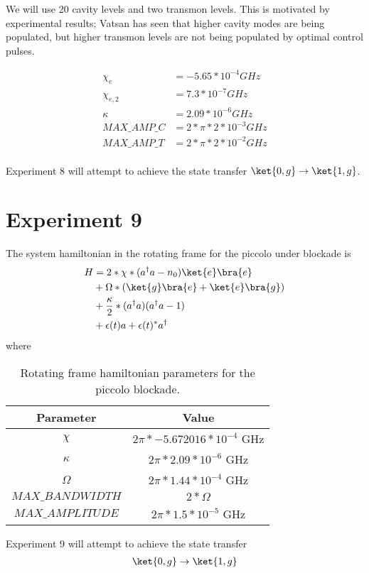 \documentclass[letterpaper, 12pt]{article}
\begin{document}
We will use 20 cavity levels and two transmon levels. This is motivated by experimental results; Vatsan has seen that higher cavity modes are being populated, but higher transmon levels are not being populated by optimal control pulses.

\begin{align*}
  \chi_{e} &= -5.65 * 10^{-4} GHz\\
  \chi_{e, 2} &= 7.3 * 10^{-7} GHz\\
  \kappa &= 2.09 * 10^{-6} GHz\\
  MAX\_AMP\_C &= 2 * \pi * 2 * 10^{-3} GHz\\
  MAX\_AMP\_T &= 2 * \pi * 2 * 10^{-2} GHz\\
\end{align*}

Experiment 8 will attempt to achieve the state transfer $\ket{0, g} \rightarrow \ket{1, g}$.

\section{Experiment 9}
The system hamiltonian in the rotating frame for the piccolo under blockade is
\begin{align*}
  H &= 2 * \chi * (a^{\dagger}a - n_{0}) \ket{e} \bra{e}\\
  &+ \Omega * (\ket{g} \bra{e} + \ket{e} \bra{g})\\
  &+ \frac{\kappa}{2} * (a^{\dagger}a)(a^{\dagger}a - 1)\\
  &+ \epsilon(t)a + \epsilon(t)^{*}a^{\dagger}
\end{align*}
where
\begin{table}[H]
  \begin{center}
    \begin{tabular}{c | c}
      Parameter & Value\\
      \hline
      $\chi$          & $2 \pi * -5.672016 * 10^{-4}$ GHz\\
      $\kappa$        & $2 \pi * 2.09 * 10^{-6}$ GHz\\
      $\Omega$        & $2 \pi * 1.44 * 10^{-4}$ GHz\\
      $MAX\_BANDWIDTH$ & $2 * \Omega$\\
      $MAX\_AMPLITUDE$ & $2 \pi * 1.5 * 10^{-5}$ GHz\\
    \end{tabular}
  \end{center}
  \caption{Rotating frame hamiltonian parameters for the piccolo blockade.}
\end{table}

Experiment 9 will attempt to achieve the state transfer
\begin{align*}
  \ket{0, g} \rightarrow \ket{1, g}
\end{align*}



\end{document}
